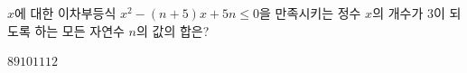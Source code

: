 $x$에 대한 이차부등식 $x^2-(n+5)x+5n\le 0$을 만족시키는 정수 $x$의 개수가 $3$이 되도록 하는 모든 자연수 $n$의 값의 합은?
\begin{choices32}{$8$}{$9$}{$10$}{$11$}{$12$}\end{choices32}
